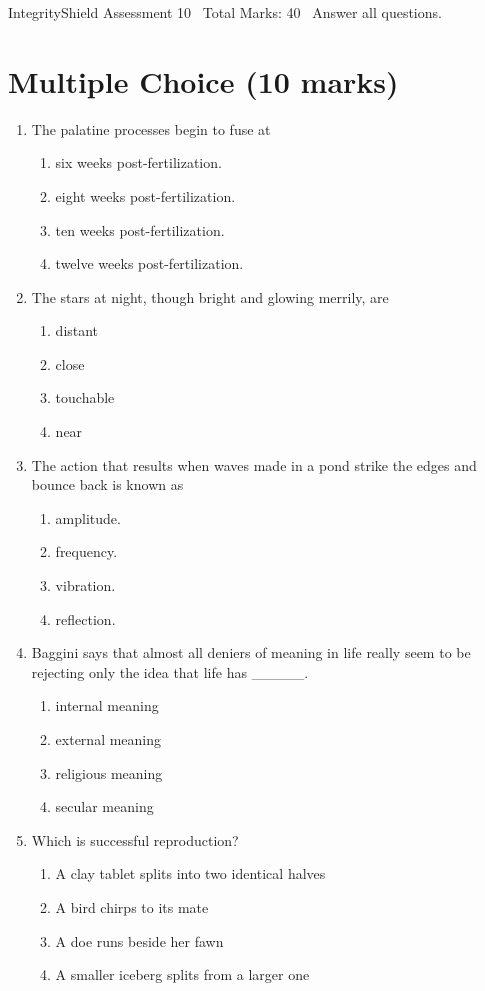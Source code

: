\documentclass[12pt]{article}
\begin{document}
\begin{center}
IntegrityShield Assessment 10 \
Total Marks: 40 \
Answer all questions.
\end{center}

\section*{Multiple Choice (10 marks)}
\begin{enumerate}[label=\arabic*.]
\item The palatine processes begin to fuse at
\begin{enumerate}[label=(\alph*)]
    \item six weeks post-fertilization.
    \item eight weeks post-fertilization.
    \item ten weeks post-fertilization.
    \item twelve weeks post-fertilization.
\end{enumerate}
\item The stars at night, though bright and glowing merrily, are
\begin{enumerate}[label=(\alph*)]
    \item distant
    \item close
    \item touchable
    \item near
\end{enumerate}
\item The action that results when waves made in a pond strike the edges and bounce back is known as
\begin{enumerate}[label=(\alph*)]
    \item amplitude.
    \item frequency.
    \item vibration.
    \item reflection.
\end{enumerate}
\item Baggini says that almost all deniers of meaning in life really seem to be rejecting only the idea that life has \_\_\_\_\_.
\begin{enumerate}[label=(\alph*)]
    \item internal meaning
    \item external meaning
    \item religious meaning
    \item secular meaning
\end{enumerate}
\item Which is successful reproduction?
\begin{enumerate}[label=(\alph*)]
    \item A clay tablet splits into two identical halves
    \item A bird chirps to its mate
    \item A doe runs beside her fawn
    \item A smaller iceberg splits from a larger one
\end{enumerate}
\end{enumerate}
\end{document}
